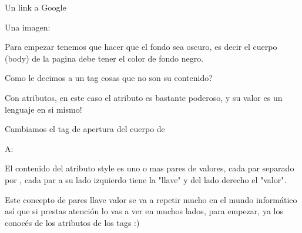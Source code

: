 \documentclass[letterpaper,10pt,spanish]{sphinxmanual}
\begin{document}
\begin{sphinxVerbatim}[commandchars=\\\{\}]
        Un link a  Google

        Una imagen:

             
\end{sphinxVerbatim}

Para empezar tenemos que hacer que el fondo sea oscuro, es decir el cuerpo
(body) de la pagina debe tener el color de fondo negro.

Como le decimos a un tag cosas que no son su contenido?

Con atributos, en este caso el atributo es bastante poderoso, y su valor es un lenguaje en si mismo!

Cambiamos el tag de apertura del cuerpo de

%
\begin{sphinxVerbatim}[commandchars=\\\{\}]
\end{sphinxVerbatim}

A:

%
\begin{sphinxVerbatim}[commandchars=\\\{\}]
 
\end{sphinxVerbatim}

El contenido del atributo style es uno o mas pares de valores, cada par separado
por \sphinxstylestrong{;}, cada par a su lado izquierdo tiene la "llave" y del lado derecho el "valor".

Este concepto de pares llave valor se va a repetir mucho en el mundo informático
así que si prestas atención lo vas a ver en muchos lados, para empezar, ya los
conocés de los atributos de los tags :)
\end{document}
